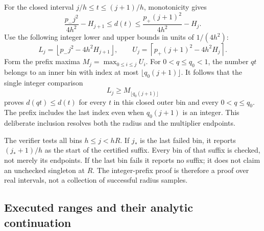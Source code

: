 \documentclass[11pt,reqno]{amsart}
\numberwithin{equation}{section}
\begin{document}
For the closed interval $j/h\le t\le(j+1)/h$, monotonicity gives
\[
 \frac{p_-j^2}{4h^2}-H_{j+1}\le d(t)\le
 \frac{p_+(j+1)^2}{4h^2}-H_j.
\]
Use the following integer lower and upper bounds in units of $1/(4h^2)$:
\begin{equation}\label{arith:bin-enclosures}
 L_j=\left\lfloor p_-j^2-4h^2H_{j+1}\right\rfloor,
 \qquad
 U_j=\left\lceil p_+(j+1)^2-4h^2H_j\right\rceil.
\end{equation}
Form the prefix maxima $M_j=\max_{0\le i\le j}U_i$.
For $0<q\le q_0<1$, the number $qt$ belongs to an inner bin with
index at most $\lfloor q_0(j+1)\rfloor$.  It follows that the single
integer comparison
\begin{equation}\label{arith:paired-test}
 L_j\ge M_{\lfloor q_0(j+1)\rfloor}
\end{equation}
proves $d(qt)\le d(t)$ for every $t$ in this closed outer bin and every
$0<q\le q_0$.  The prefix includes the last index even when
$q_0(j+1)$ is an integer.  This deliberate inclusion resolves both
the radius and the multiplier endpoints.

The verifier tests all bins $h\le j<hR$.  If $j_*$ is the last failed
bin, it reports $(j_*+1)/h$ as the start of the certified suffix.
Every bin of that suffix is checked, not merely its endpoints.  If the
last bin fails it reports no suffix; it does not claim an unchecked
singleton at $R$.  The integer-prefix proof is therefore a proof over
real intervals, not a collection of successful radius samples.

\subsection{Executed ranges and their analytic continuation}
\end{document}
